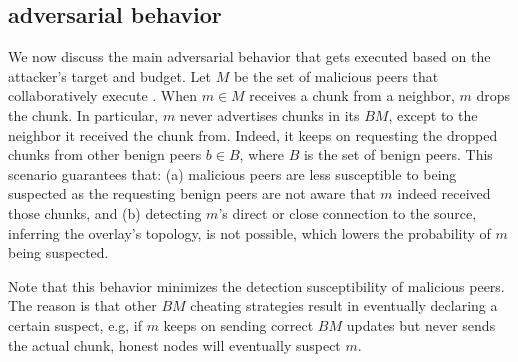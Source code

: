 \subsection{\drop adversarial behavior}
We now discuss the main adversarial behavior that gets executed based on the attacker's target and budget. 
Let $M$ be the set of malicious peers that collaboratively execute \drop. 
When $m \in M$ receives a chunk from a neighbor, $m$ drops the chunk.
In particular, $m$ never advertises chunks in its $BM$, except to the neighbor it received the chunk from.
Indeed, it keeps on requesting the dropped chunks from other benign peers $b \in B$, where $B$ is the set of benign peers.
This scenario guarantees that: (a) malicious peers are less susceptible to being suspected as the requesting benign peers are not aware that $m$ indeed received those chunks,
and (b) detecting $m$'s direct or close connection to the source, inferring the overlay's topology, is not possible, which lowers the probability of $m$ being suspected.


Note that this behavior minimizes the detection susceptibility of malicious peers.
The reason is that other $BM$ cheating strategies result in eventually declaring a certain suspect, e.g, if $m$ keeps on sending correct $BM$ updates but never sends the actual chunk, honest nodes will eventually suspect $m$.


 





